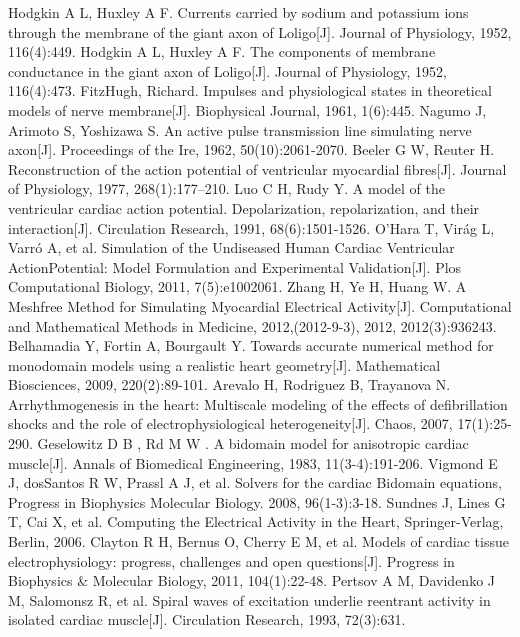 \documentclass[twoside,UTF8]{nputhesis}
\begin{document}
\begin{thebibliography}{99}
	Hodgkin A L, Huxley A F. Currents carried by sodium and potassium ions through the membrane of the giant axon of Loligo[J]. Journal of Physiology, 1952, 116(4):449.
	Hodgkin A L, Huxley A F. The components of membrane conductance in the giant axon of Loligo[J]. Journal of Physiology, 1952, 116(4):473.
	FitzHugh, Richard. Impulses and physiological states in theoretical models of nerve membrane[J]. Biophysical Journal, 1961, 1(6):445.
	Nagumo J, Arimoto S, Yoshizawa S. An active pulse transmission line simulating nerve axon[J]. Proceedings of the Ire, 1962, 50(10):2061-2070.
	Beeler G W, Reuter H. Reconstruction of the action potential of ventricular myocardial fibres[J]. Journal of Physiology, 1977, 268(1):177–210.
	Luo C H, Rudy Y. A model of the ventricular cardiac action potential. Depolarization, repolarization, and their interaction[J]. Circulation Research, 1991, 68(6):1501-1526.
	O'Hara T, Virág L, Varró A, et al. Simulation of the Undiseased Human Cardiac Ventricular ActionPotential: Model Formulation and Experimental Validation[J]. Plos Computational Biology, 2011, 7(5):e1002061.
	Zhang H, Ye H, Huang W. A Meshfree Method for Simulating Myocardial Electrical Activity[J]. Computational and Mathematical Methods in Medicine, 2012,(2012-9-3), 2012, 2012(3):936243.
	Belhamadia Y, Fortin A, Bourgault Y. Towards accurate numerical method for monodomain models using a realistic heart geometry[J]. Mathematical Biosciences, 2009, 220(2):89-101.
	Arevalo H, Rodriguez B, Trayanova N. Arrhythmogenesis in the heart: Multiscale modeling of the effects of defibrillation shocks and the role of electrophysiological heterogeneity[J]. Chaos, 2007, 17(1):25-290.
	Geselowitz D B , Rd M W . A bidomain model for anisotropic cardiac muscle[J]. Annals of Biomedical Engineering, 1983, 11(3-4):191-206.
	Vigmond E J, dosSantos R W, Prassl A J, et al. Solvers for the cardiac Bidomain equations, Progress in Biophysics Molecular Biology. 2008, 96(1-3):3-18.
	Sundnes J, Lines G T, Cai X, et al. Computing the Electrical Activity in the Heart, Springer-Verlag, Berlin, 2006.
	Clayton R H, Bernus O, Cherry E M, et al. Models of cardiac tissue electrophysiology: progress, challenges and open questions[J]. Progress in Biophysics \& Molecular Biology, 2011, 104(1):22-48.
	Pertsov A M, Davidenko J M, Salomonsz R, et al. Spiral waves of excitation underlie reentrant activity in isolated cardiac muscle[J]. Circulation Research, 1993, 72(3):631.

\end{thebibliography}
\end{document}
